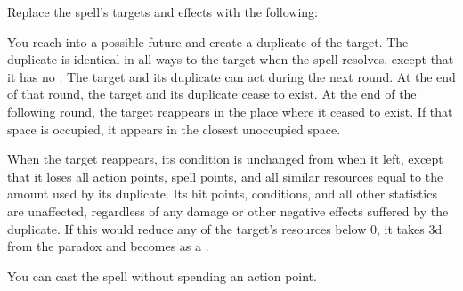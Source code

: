 Replace the spell's targets and effects with the following:
\begin{spellcontent}

\begin{augmenttargetinginfo}




\end{augmenttargetinginfo}


\begin{augmenteffects}



\spelleffect
You reach into a possible future and create a duplicate of the target.
The duplicate is identical in all ways to the target when the spell resolves, except that it has no .
The target and its duplicate can act during the next round.
At the end of that round, the target and its duplicate cease to exist.
At the end of the following round, the target reappears in the place where it ceased to exist.
If that space is occupied, it appears in the closest unoccupied space.

When the target reappears, its condition is unchanged from when it left, except that it loses all action points, spell points, and all similar resources equal to the amount used by its duplicate.
Its hit points, conditions, and all other statistics are unaffected, regardless of any damage or other negative effects suffered by the duplicate.
If this would reduce any of the target's resources below 0, it takes  \plus3d from the paradox and becomes  as a .








\end{augmenteffects}

\end{spellcontent}





You can cast the spell without spending an action point.








